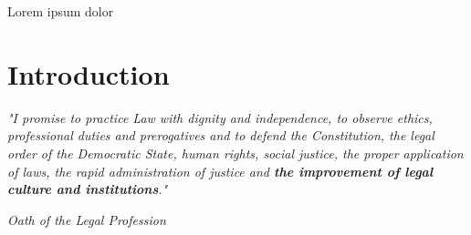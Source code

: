 \documentclass[
  12pt,
]{article}
\begin{document}
Lorem ipsum dolor

\newpage{}

\section{Introduction}\label{sec-introduction}

\vspace*{\fill}

\noindent\hfill
\begin{minipage}{0.50\textwidth}
\singlespacing
\justifying

\textit{\fontsize{10}{12}\selectfont"I promise to practice Law with dignity and independence, to observe ethics, professional duties and prerogatives and to defend the Constitution, the legal order of the Democratic State, human rights, social justice, the proper application of laws, the rapid administration of justice and \textbf{the improvement of legal culture and institutions}."
}
\vspace{1ex}
\begin{flushright}
\textit{Oath of the Legal Profession\footnotemark}
\end{flushright}
\end{minipage}


\vspace*{\fill}
\end{document}
